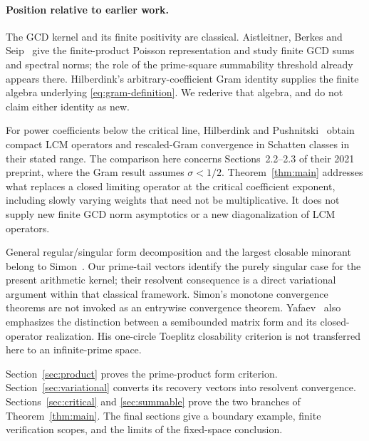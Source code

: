 \paragraph{Position relative to earlier work.}
The GCD kernel and its finite positivity are classical.
Aistleitner, Berkes and Seip~\citep{aistleitner2015gcd} give the
finite-product Poisson representation and study finite GCD sums and
spectral norms; the role of the prime-square summability threshold
already appears there. Hilberdink's arbitrary-coefficient Gram identity
\citep[Proposition~2.1]{hilberdink2017singular} supplies the finite algebra
underlying \eqref{eq:gram-definition}. We rederive that algebra, and do
not claim either identity as new.

For power coefficients below the critical line,
Hilberdink and Pushnitski~\citep{hilberdink2023spectral} obtain compact
LCM operators and rescaled-Gram convergence in Schatten classes in their
stated range. The comparison here concerns Sections~2.2--2.3 of their
2021 preprint, where the Gram result assumes $\sigma<1/2$.
Theorem~\ref{thm:main} addresses what replaces a closed limiting
operator at the critical coefficient exponent, including slowly varying
weights that need not be multiplicative. It does not supply new finite
GCD norm asymptotics or a new diagonalization of LCM operators.

General regular/singular form decomposition and the largest closable
minorant belong to Simon~\citep[Section~2]{simon1978canonical}.
Our prime-tail vectors identify the purely singular case for the present
arithmetic kernel; their resolvent consequence is a direct variational
argument within that classical framework. Simon's monotone convergence
theorems are not invoked as an entrywise convergence theorem.
Yafaev~\citep{yafaev2017semibounded} also emphasizes the distinction
between a semibounded matrix form and its closed-operator realization.
His one-circle Toeplitz closability criterion is not transferred here
to an infinite-prime space.

Section~\ref{sec:product} proves the prime-product form criterion.
Section~\ref{sec:variational} converts its recovery vectors into
resolvent convergence. Sections~\ref{sec:critical} and
\ref{sec:summable} prove the two branches of Theorem~\ref{thm:main}.
The final sections give a boundary example, finite verification scopes,
and the limits of the fixed-space conclusion.
